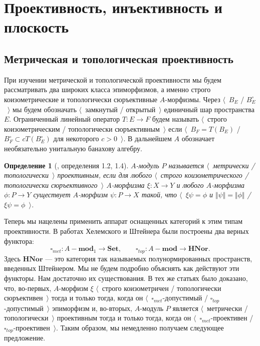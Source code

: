 \documentclass[12pt]{article}
\newtheorem{definition}[theorem]{Определение}
\begin{document}
\section{Проективность, инъективность и плоскость}
\label{SectionProjectivityInjectivityAndFlatness}


\subsection{Метрическая и топологическая проективность}
\label{SubSectionMetricAndTopologicalProjectivity}

При изучении метрической и топологической проективности мы будем рассматривать два широких класса эпиморфизмов, а именно строго коизометрические и топологически сюръективные $A$-морфизмы. Через $\langle$~$B_E$ / $B_E^\circ$~$\rangle$ мы будем обозначать $\langle$~замкнутый / открытый~$\rangle$ единичный шар пространства $E$. Ограниченный линейный оператор $T:E\to F$ будем называть $\langle$~строго коизометрическим / топологически сюръективным~$\rangle$ если $\langle$~$B_F=T(B_E)$ / $B_F^\circ\subset cT(B_E^\circ)$ для некоторого $c>0$~$\rangle$. В дальнейшем $A$ обозначает необязательно унитальную банахову алгебру. 

\begin{definition}[\cite{HelMetrFrQMod}, определения 1.2, 1.4]\label{MetTopProjMod} $A$-модуль $P$ называется $\langle$~метрически / топологически~$\rangle$ проективным, если для любого $\langle$~строго коизометрического / топологически сюръективного~$\rangle$ $A$-морфизма $\xi:X\to Y$ и любого $A$-морфизма $\phi:P\to Y$ существует $A$-морфизм $\psi:P\to X$ такой, что $\langle$~$\xi\psi=\phi$ и $\Vert\psi\Vert=\Vert\phi\Vert$ / $\xi\psi=\phi$~$\rangle$.
\end{definition}

Теперь мы нацелены применить аппарат оснащенных категорий к этим типам проективности. В работах Хелемского \cite{HelMetrFrQMod} и Штейнера \cite{ShtTopFrClassicQuantMod} были построены два верных функтора: 
$$
\square_{met}:A-\mathbf{mod}_1\to\mathbf{Set},
\qquad
\square_{top}:A-\mathbf{mod}\to\mathbf{HNor}.
$$
Здесь $\mathbf{HNor}$ --- это категория так называемых полунормированных пространств, введенных Штейнером. Мы не будем подробно объяснять как действуют эти функторы. Нам достаточно их существования. В тех же статьях было доказано, что, во-первых, $A$-морфизм $\xi$ $\langle$~строго коизометричен / топологически сюръективен~$\rangle$ тогда и только тогда, когда он $\langle$~$\square_{met}$-допустимый / $\square_{top}$-допустимый~$\rangle$ эпиморфизм и, во-вторых, $A$-модуль $P$ является $\langle$~метрически / топологически~$\rangle$ проективным тогда и только тогда, когда он $\langle$~$\square_{met}$-проективен / $\square_{top}$-проективен~$\rangle$. Таким образом, мы немедленно получаем следующее предложение.
\end{document}
